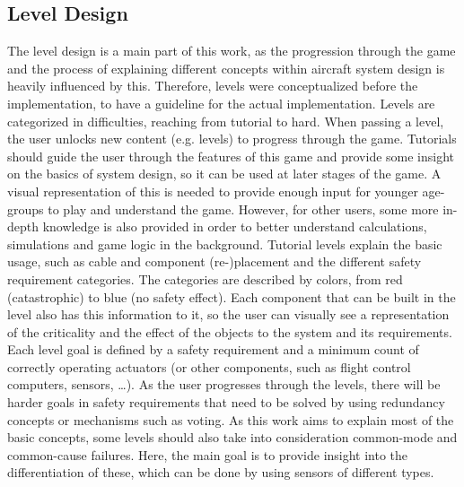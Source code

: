 \subsection{Level Design}\label{subsec:level-design}
The level design is a main part of this work, as the progression through the game and the process of explaining different concepts
within aircraft system design is heavily influenced by this.
Therefore, levels were conceptualized before the implementation, to have a guideline for the actual implementation.
Levels are categorized in difficulties, reaching from tutorial to hard.
When passing a level, the user unlocks new content (e.g. levels) to progress through the game.
Tutorials should guide the user through the features of this game and provide some insight on the basics of system design, so
it can be used at later stages of the game.
A visual representation of this is needed to provide enough input for younger age-groups to play and understand the game.
However, for other users, some more in-depth knowledge is also provided in order to better understand calculations, simulations and
game logic in the background.
Tutorial levels explain the basic usage, such as cable and component (re-)placement and the different safety requirement
categories.
The categories are described by colors, from red (catastrophic) to blue (no safety effect).
Each component that can be built in the level also has this information to it, so the user can visually see a representation
of the criticality and the effect of the objects to the system and its requirements.
Each level goal is defined by a safety requirement and a minimum count of correctly operating actuators (or other components, such
as flight control computers, sensors, \ldots).
As the user progresses through the levels, there will be harder goals in safety requirements that need to be solved by using
redundancy concepts or mechanisms such as voting.
As this work aims to explain most of the basic concepts, some levels should also take into consideration common-mode and common-cause
failures.
Here, the main goal is to provide insight into the differentiation of these, which can be done by using sensors of different types.
